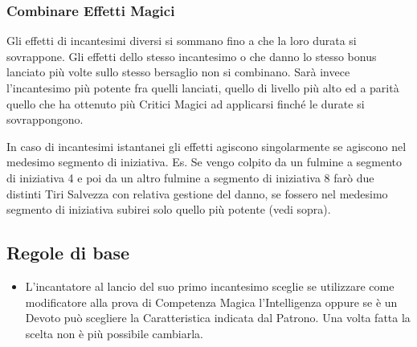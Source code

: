 \begin{multicols}{2}
\subsubsection{Combinare Effetti Magici}\label{magiecombinareeffettimagici}

Gli effetti di incantesimi diversi si sommano fino a che la loro durata si sovrappone. Gli effetti dello stesso incantesimo o che danno lo stesso bonus lanciato più volte sullo stesso bersaglio non si combinano. Sarà invece l'incantesimo più potente fra quelli lanciati, quello di livello più alto ed a parità quello che ha ottenuto più Critici Magici ad applicarsi finché le durate si sovrappongono.

In caso di incantesimi istantanei gli effetti agiscono singolarmente se agiscono nel medesimo segmento di iniziativa. Es. Se vengo colpito da un fulmine a segmento di iniziativa 4 e poi da un altro fulmine a segmento di iniziativa 8 farò due distinti Tiri Salvezza con relativa gestione del danno, se fossero nel medesimo segmento di iniziativa subirei solo quello più potente (vedi sopra).


\subsection{Regole di base}\label{magieregoledibase}

\begin{itemize}[leftmargin=*] \setlength{\itemsep}{0pt}

\item
L'incantatore al lancio del suo primo incantesimo sceglie se utilizzare come modificatore alla prova di Competenza Magica l'Intelligenza oppure se è un Devoto può scegliere la Caratteristica indicata dal Patrono. Una volta fatta la scelta non è più possibile cambiarla. 


\end{itemize}
\end{multicols}
